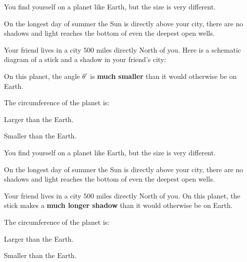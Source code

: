 \documentclass{ximera}
\begin{document}
\begin{exercise}
 You find yourself on a planet like Earth, but the size is very different. 
 
 On the longest day of summer the Sun is directly above your city, there are no shadows and light reaches the bottom of even the deepest open wells.

Your friend lives in a city $500$ miles directly North of you. Here is a schematic diagram of a stick and a shadow in your friend's city:
  \begin{center}
    \end{center}
    On this planet, the angle $\theta^\circ$ is \textbf{much smaller}  than it would otherwise be on Earth.
     
The circumference of the planet is:
\begin{enumerate}
\begin{multicols}{2}
\item Larger than the Earth.
\item Smaller than the Earth.
\end{multicols}
 \end{enumerate}
\end{exercise}

\begin{exercise}
 You find yourself on a planet like Earth, but the size is very different. 
 
 On the longest day of summer the Sun is directly above your city, there are no shadows and light reaches the bottom of even the deepest open wells.

 Your friend lives in a city $500$ miles directly North of you. On this planet, the stick makes a \textbf{much longer shadow} than it would otherwise be on Earth.
     
The circumference of the planet is:
\begin{enumerate}
\begin{multicols}{2}
\item Larger than the Earth.
\item Smaller than the Earth.
\end{multicols}
 \end{enumerate}
\end{exercise}





\end{document}
